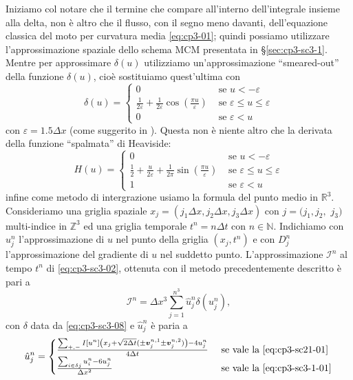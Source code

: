 Iniziamo col notare che il termine che compare all'interno
dell'integrale insieme alla delta, non è altro che il flusso, con il
segno meno davanti, dell'equazione classica del moto per curvatura
media \eqref{eq:cp3-01}; quindi possiamo utilizzare l'approssimazione
spaziale dello schema MCM presentata in §\ref{sec:cp3-sc3-1}. Mentre
per approssimare $\delta(u)$ utilizziamo un'approssimazione
``smeared-out'' della funzione $\delta(u)$, cioè sostituiamo
quest'ultima con
\begin{equation}
  \label{eq:cp3-sc3-08}
  \delta(u)=
  \begin{cases}
    0 &\text{ se $u<-\varepsilon$} \\
    \frac{1}{2\varepsilon}+\frac{1}{2\varepsilon}\cos\left(\frac{\pi
      u}{\varepsilon}\right) &\text{ se $\varepsilon\leq u \leq\varepsilon$} \\
    0 &\text{ se $\varepsilon<u$}
  \end{cases}
\end{equation}
con $\varepsilon=1.5\Delta x$ (come suggerito in
\cite[][§1.5]{osher:fed}). Questa non è niente altro che la derivata
della funzione ``spalmata'' di Heaviside:
\[
H(u)=
\begin{cases}
 0 &\text{ se $u<-\varepsilon$} \\
    \frac{1}{2}+\frac{u}{2\varepsilon} +\frac{1}{2\pi}\sin\left(\frac{\pi
      u}{\varepsilon}\right) &\text{ se $\varepsilon\leq u \leq\varepsilon$} \\
 1 &\text{ se $\varepsilon<u$} 
\end{cases}
\]
infine come metodo di intergrazione usiamo la formula del punto medio
in $\mathbb{R}^3$. 
Consideriamo una griglia spaziale $x_j=(j_1\Delta x,j_2\Delta
x,j_3\Delta x)$ con $j=(j_1,j_2,$ $j_3)$ multi-indice in $\mathbb{Z}^3$ ed una griglia temporale $t^n=n\Delta t$ con $n\in\mathbb{N}$.
Indichiamo con $u_j^n$ l'approssimazione di $u$ nel punto della
griglia $(x_j,t^n)$ e con $D_j^n$ l'approssimazione del gradiente di
$u$ nel suddetto punto. L'approssimazione $\mathcal{I}^n$ al
tempo $t^n$ di  \eqref{eq:cp3-sc3-02}, ottenuta con il metodo precedentemente
descritto è pari a 
\begin{equation}
\label{eq:cp3-sc3-08-add}
\mathcal{I}^n=\Delta x^3\sum_{j=1}^{n^3}\hat{u}_j^n\delta(u_j^n),
\end{equation}
con $\delta$ data da \eqref{eq:cp3-sc3-08} e $\hat{u}_j^n$ è paria a 
\[
\hat{u}_j^n=
\begin{cases}
\frac{\sum_{+,-}I[u^n]\left(x_j+\sqrt{2\Delta
    t}(\pm\vec{v}_j^{n,1}\pm\vec{v}_j^{n,2})\right)-4u_j^n}{4\Delta t}
&\text{ se vale la \eqref{eq:cp3-sc21-01}} \\
\frac{\sum_{i\in\delta{j}}u_i^n-6u_j^n}{\Delta x^2}&\text{ se vale la \eqref{eq:cp3-sc3-1-01}}
\end{cases}
\]
